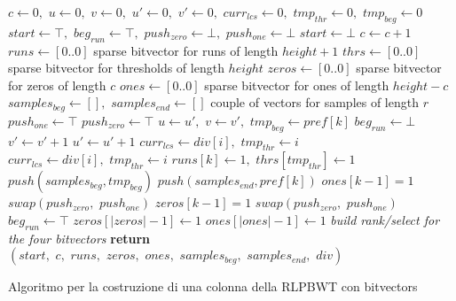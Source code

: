 \documentclass[a4paper,12pt, oneside]{book}
\begin{document}
\begin{algorithm}[H]
  \scriptsize
  \begin{algorithmic}[1]
    \State $c\gets 0,\,\,u\gets 0,\,\,v\gets 0,\,\,u'\gets 0,\,\, v'\gets
    0,\,\,curr_{lcs}\gets 0,\,\,tmp_{thr}\gets 0,\,\,tmp_{beg}\gets 0$
    \State $start \gets \top,\,\,beg_{run}\gets \top,\,\,push_{zero}\gets
    \bot,\,\,push_{one}\gets \bot$
    \For {\textit{every} $k\in\left[0,\,\, height\right)$}
    \State $start \gets \bot$
    \EndIf
    \State $c\gets c+1$
    \EndIf
    \EndFor
    \State $runs\gets[0..0]$
    \Comment sparse bitvector for runs of length $height+1$
    \State $thrs\gets[0..0]$
    \Comment sparse bitvector for thresholds of length $height$
    \State $zeros\gets[0..0]$
    \Comment sparse bitvector for zeros of length $c$
    \State $ones\gets[0..0]$
    \Comment sparse bitvector for ones of length $height-c$
    \State $samples_{beg} \gets [],\,\,samples_{end}\gets []$
    \Comment couple of vectors for samples of length $r$
    \State $push_{one}\gets \top$
    \Else
    \State $push_{zero}\gets \top$
    \EndIf
    \For {\textit{every} $k\in\left[0,\,\, height\right)$}
    \State $u\gets u',\,\,v\gets v',\,\,tmp_{beg}\gets pref[k]$
    \State $beg_{run}\gets \bot$
    \EndIf
    \State $v'\gets v'+1$
    \Else
    \State $u'\gets u'+1$
    \EndIf
    \State $curr_{lcs}\gets div[i],\,\,tmp_{thr}\gets i$
    \EndIf
    \State $curr_{lcs}\gets div[i],\,\,tmp_{thr}\gets i$
    \EndIf
    \State $runs[k]\gets 1,\,\,thrs[tmp_{thr}]\gets 1$
    \State $push(samples_{beg}, tmp_{beg})$
    \State $push(samples_{end}, pref[k])$
    \State $ones[k-1]=1$
    \EndIf
    \State $swap(push_{zero},\,\,push_{one})$
    \Else
    \State $zeros[k-1]=1$
    \EndIf
    \State $swap(push_{zero},\,\,push_{one})$
    \EndIf
    \State $beg_{run}\gets \top$
    \EndIf
    \EndFor
    \State $zeros[|zeros|-1]\gets 1$
    \EndIf
    \State $ones[|ones|-1]\gets 1$
    \EndIf
    \State \textit{build rank/select for the four bitvectors}
    \State \textbf{return}
    $(start,\,\,c,\,\,runs,\,\,zeros,\,\,ones,\,\,samples_{beg},\,\,samples_{end},\,\,div)$ 
    \EndFunction
  \end{algorithmic}
  \caption{{\footnotesize{Algoritmo per la costruzione di una colonna della RLPBWT con bitvectors}}}
\end{algorithm}
\end{document}
